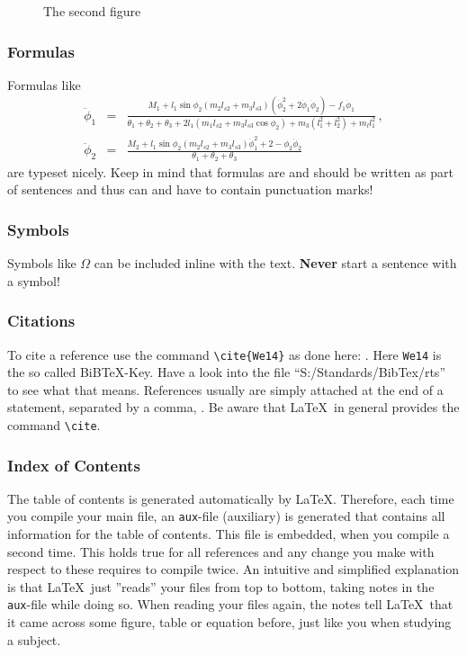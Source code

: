 \begin{figure}[ht]
  \centering
  \caption{The second figure}
  \label{f:xfigfigure}
\end{figure}

\subsubsection{Formulas}

Formulas like
\begin{eqnarray}
\ddot{\phi}_1
    &=&
    \frac{M_1+l_1 \sin \phi_2
    (m_2 l_{s2} + m_3 l_{s3})
    (\dot{\phi}_2^2+2 \dot{\phi}_1\dot{\phi}_2 )
    -f_1 \dot{\phi}_1}
    {\theta_1+\theta_2+\theta_3+2l_1 (m_1 l_{s2}+m_3 l_{s3} \cos \phi_2)+
    m_3 (l_1^2+l_2^2)+m_l l_1^2}  \,,  \label{e:eqnfirst} \\
\ddot{\phi}_2
    &=&
    \frac{M_2 + l_1 \sin \phi_2 (m_2 l_{s2} + m_3 l_{s3})
    \dot{\phi}_1^2 +2 - \phi_2 \dot{\phi}_2}
    {\theta_1+\theta_2+\theta_3} \, \label{e:eqnsecond}
\end{eqnarray}
are typeset nicely. Keep in mind that formulas are and should be written as part of sentences and thus can and have to contain punctuation marks!


\subsubsection{Symbols}

Symbols like $\Omega$ can be included inline with the text. \textbf{Never} start a sentence with a symbol!


\subsubsection{Citations}

To cite a reference use the command \verb'\cite{We14}' as done here: \cite{We14}. Here \texttt{We14} is the so called BiB\TeX-Key. Have a look into the file ``S:/Standards/BibTex/rts''
to see what that means. References usually are simply attached at the end of a statement, separated by a comma,
\cite{We14}. Be aware that \LaTeX\ in general provides the command \verb'\cite'.

\subsubsection{Index of Contents}

The table of contents is generated automatically by \LaTeX. Therefore, each time you compile your main file, an \texttt{aux}-file (auxiliary) is generated that contains all 
information for the table of contents. This file is embedded, when you compile a second time. This holds true for all references and any change you make with respect to these
requires to compile twice. An intuitive and simplified explanation is that \LaTeX\ just ''reads'' your files from top to bottom, taking notes in the \texttt{aux}-file while doing so.
When reading your files again, the notes tell \LaTeX\ that it came across some figure, table or equation before, just like you when studying a subject.


